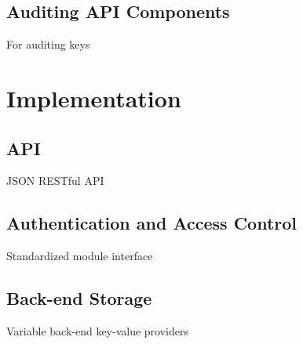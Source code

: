 \subsection{Auditing API Components}

For auditing  keys

\section{Implementation}

\subsection{API}

JSON RESTful API

\subsection{Authentication and Access Control}

Standardized module interface

\subsection{Back-end Storage}

Variable back-end key-value providers

